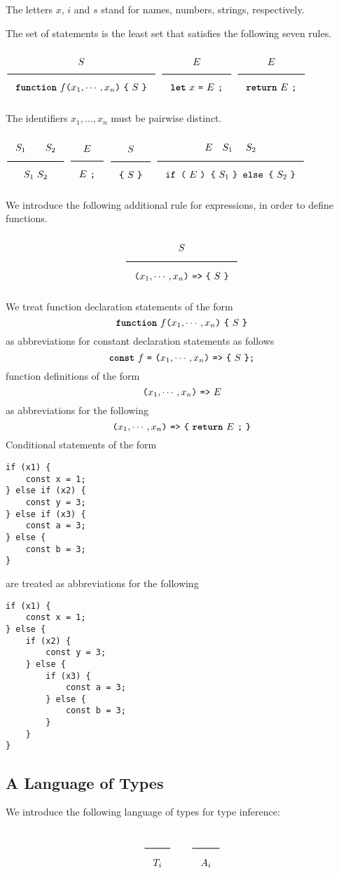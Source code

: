 The letters $x$, $i$ and $s$ stand for names, numbers, strings, respectively.

The set of statements is 
the least set that satisfies the
following seven rules.

$\Rule{S}{\Fun\ f \Lp x_1,\cdots, x_n\Rp\ \Lc\ S\ \Rc}$
\hfill
$\Rule{E}{\Let\ x\ \texttt{=}\ E\ \texttt{;}}$
\hfill
$\Rule{E}{\Return\ E\ \texttt{;}}$

\noindent
The identifiers $x_1,\ldots,x_n$ must be pairwise distinct.

$\Rule{S_1 \qquad S_2}{S_1\ S_2}$
\hfill
$\Rule{E}{E\ \texttt{;}}$
\hfill
$\Rule{S}{\Lc\ S\ \Rc}$
\hfill
$\Rule{E \quad S_1\ \quad S_2}{\texttt{if (}\ E \ \texttt{) \{}\ S_1\ \texttt{\} else \{}\ S_2\ \texttt{\}}}$

\noindent
We introduce the following additional rule for expressions, in order
to define functions.

\[ \Rule{S}{\Lp x_1,\cdots, x_n\Rp\ \texttt{=>}\ \Lc\ S\ \Rc} \]

\noindent
We treat function declaration statements of the form
%
\[ \Fun\ f \Lp x_1,\cdots, x_n\Rp\ \Lc\ S\ \Rc \]
%
\noindent
as abbreviations for constant declaration statements as follows
%
\[ \textbf{\texttt{const}}\ f\ \texttt{=}\ \texttt{(} x_1,\cdots, x_n\texttt{)}\ \texttt{=>}\ \texttt{\{}\ S\ \texttt{\}} \texttt{;} \]
%
function definitions of the form 
%
\[ \texttt{(} x_1,\cdots, x_n\texttt{)}\ \texttt{=>}\ E \]
%
\noindent
as abbreviations for the following
%
\[ \Lp x_1,\cdots, x_n\Rp\ \texttt{=>}\ \Lc\ \Return\ E\ \texttt{;}\ \Rc \]
%
Conditional statements of the form 
\begin{lstlisting}
if (x1) {
    const x = 1;    
} else if (x2) {
    const y = 3;
} else if (x3) {
    const a = 3;
} else {
    const b = 3;
}
\end{lstlisting}
\noindent
are treated as abbreviations for the following
\begin{lstlisting}
if (x1) {
    const x = 1;    
} else {
    if (x2) {
        const y = 3;
    } else {
        if (x3) {
            const a = 3;
        } else {
            const b = 3;
        }
    }
}
\end{lstlisting}
  
\subsection{A Language of Types}
\label{simpltyped}

We introduce the following language of types for type inference:

\[
\Rule{}{T_i}
\qquad
\Rule{}{A_i}
\]

